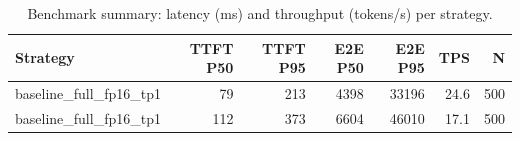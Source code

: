 \begin{table}
\caption{Benchmark summary: latency (ms) and throughput (tokens/s) per strategy.}
\label{tab:summary}
\begin{tabular}{lrrrrrr}
\toprule
Strategy & TTFT P50 & TTFT P95 & E2E P50 & E2E P95 & TPS & N \\
\midrule
baseline_full_fp16_tp1 & 79 & 213 & 4398 & 33196 & 24.6 & 500 \\
baseline_full_fp16_tp1 & 112 & 373 & 6604 & 46010 & 17.1 & 500 \\
\bottomrule
\end{tabular}
\end{table}
